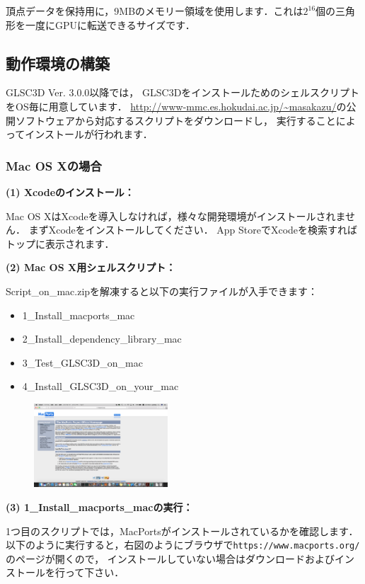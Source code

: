 \documentclass[platex,a4paper,12pt]{jsarticle}%
\begin{document}
頂点データを保持用に，9MBのメモリー領域を使用します．これは$2^{16}$個の三角形を一度にGPUに転送できるサイズです．

\subsection{動作環境の構築}
GLSC3D Ver. 3.0.0以降では，
GLSC3DをインストールためのシェルスクリプトをOS毎に用意しています．
\url{http://www-mmc.es.hokudai.ac.jp/~masakazu/}の公開ソフトウェアから対応するスクリプトをダウンロードし，
実行することによってインストールが行われます．

\subsubsection{Mac OS Xの場合}

\noindent
{\bf (1) Xcodeのインストール：}

Mac OS XはXcodeを導入しなければ，様々な開発環境がインストールされません．
まずXcodeをインストールしてください．
App StoreでXcodeを検索すればトップに表示されます．

\noindent 
{\bf (2) Mac OS X用シェルスクリプト：} 

Script\_on\_mac.zipを解凍すると以下の実行ファイルが入手できます：
\begin{itemize}
\item[] 1\_Install\_macports\_mac
\item[] 2\_Install\_dependency\_library\_mac
\item[] 3\_Test\_GLSC3D\_on\_mac
\item[] 4\_Install\_GLSC3D\_on\_your\_mac
\end{itemize}

\begin{figure}
\includegraphics[width=50mm]{Canvas_macports.eps}
\vspace{-4\baselineskip}
\end{figure}

\noindent 
{\bf (3) 1\_Install\_macports\_macの実行：} 

1つ目のスクリプトでは，MacPortsがインストールされているかを確認します．
以下のように実行すると，右図のようにブラウザで\verb|https://www.macports.org/|のページが開くので，
インストールしていない場合はダウンロードおよびインストールを行って下さい．
\end{document}
